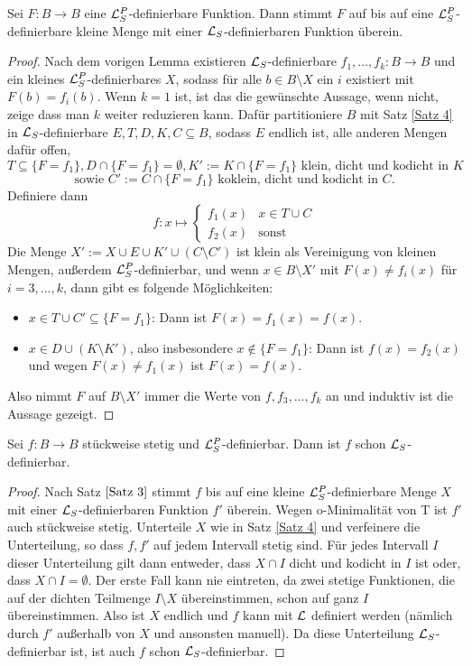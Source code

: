 \begin{theorem}\label{Satz 3}
	Sei $F:B\rightarrow B$ eine $\mathcal{L}^P_S$-definierbare Funktion. Dann stimmt $F$ auf bis auf eine $\mathcal{L}^P_S$-definierbare kleine Menge mit einer $\mathcal{L}_S$-definierbaren Funktion überein.
\end{theorem}
\begin{proof}
	Nach dem vorigen Lemma existieren $\mathcal{L}_S$-definierbare $f_1,\dots,f_k:B\rightarrow B$ und ein kleines $\mathcal{L}^P_S$-definierbares $X$, sodass für alle $b\in B\setminus X$ ein $i$ existiert mit $F(b)=f_i(b)$. Wenn $k=1$ ist, ist das die gewünschte Aussage, wenn nicht, zeige dass man $k$ weiter reduzieren kann. Dafür partitioniere $B$ mit Satz \ref{Satz 4} in $\mathcal{L}_S$-definierbare $E,T,D,K,C\subseteq B$, sodass $E$ endlich ist, alle anderen Mengen dafür offen, 
	$$T\subseteq\{F=f_1\}, D\cap\{F=f_1\}=\emptyset,K':=K\cap\{F=f_1\}\text{ klein, dicht und kodicht in }K$$ $$\text{sowie }C':=C\cap\{F=f_1\}\text{ koklein, dicht und kodicht in }C.$$
	Definiere dann $$f:x\mapsto\left\{\begin{array}{ll}
	f_1(x)&x\in T\cup C\\
	f_2(x)&\text{sonst}
	\end{array}\right.$$
	Die Menge $X':=X\cup E\cup K'\cup (C\setminus C')$ ist klein als Vereinigung von kleinen Mengen, außerdem $\mathcal{L}^P_S$-definierbar, und wenn $x\in B\setminus X'$ mit $F(x)\neq f_i(x)$ für $i=3,\dots,k$, dann gibt es folgende Möglichkeiten:
	\begin{itemize}
		\item $x\in T\cup C'\subseteq\{F=f_1\}$: Dann ist $F(x)=f_1(x)=f(x)$.
		\item $x\in D\cup(K\setminus K')$, also insbesondere $x\notin\{F=f_1\}$: Dann ist $f(x)=f_2(x)$ und wegen $F(x)\neq f_1(x)$ ist $F(x)=f(x)$.
	\end{itemize}
    Also nimmt $F$ auf $B\setminus X'$ immer die Werte von $f,f_3,\dots,f_k$ an und induktiv ist die Aussage gezeigt.
\end{proof}

\begin{lemma}\label{Stückweise stetige Abbildungen}
	Sei $f:B\rightarrow B$ stückweise stetig und $\mathcal{L}^P_S$-definierbar. Dann ist $f$ schon $\mathcal{L}_S$-definierbar.
\end{lemma}
\begin{proof}
	Nach Satz $\ref{Satz 3}$ stimmt $f$ bis auf eine kleine $\mathcal{L}^P_S$-definierbare Menge $X$ mit einer $\mathcal{L}_S$-definierbaren Funktion $f'$ überein. Wegen o-Minimalität von T ist $f'$ auch stückweise stetig. Unterteile $X$ wie in Satz \ref{Satz 4} und verfeinere die Unterteilung, so dass $f,f'$ auf jedem Intervall stetig sind. Für jedes Intervall $I$ dieser Unterteilung gilt dann entweder, dass $X\cap I$ dicht und kodicht in $I$ ist oder, dass $X\cap I=\emptyset$. Der erste Fall kann nie eintreten, da zwei stetige Funktionen, die auf der dichten Teilmenge $I\setminus X$ übereinstimmen, schon auf ganz $I$ übereinstimmen. Also ist $X$ endlich und $f$ kann mit $\mathcal{L}$ definiert werden (nämlich durch $f'$ außerhalb von $X$ und ansonsten manuell). Da diese Unterteilung $\mathcal{L}_S$-definierbar ist, ist auch $f$ schon $\mathcal{L}_S$-definierbar.
\end{proof}

